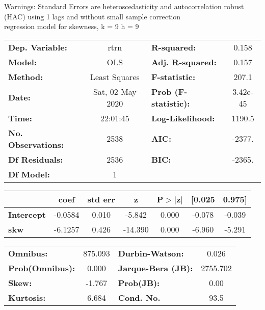 Warnings: \newline
 [1] Standard Errors are heteroscedasticity and autocorrelation robust (HAC) using 1 lags and without small sample correction\\ 

regression model for skewness, k = 9 h = 9\begin{center}
\begin{tabular}{lclc}
\toprule
\textbf{Dep. Variable:}    &       rtrn       & \textbf{  R-squared:         } &     0.158   \\
\textbf{Model:}            &       OLS        & \textbf{  Adj. R-squared:    } &     0.157   \\
\textbf{Method:}           &  Least Squares   & \textbf{  F-statistic:       } &     207.1   \\
\textbf{Date:}             & Sat, 02 May 2020 & \textbf{  Prob (F-statistic):} &  3.42e-45   \\
\textbf{Time:}             &     22:01:45     & \textbf{  Log-Likelihood:    } &    1190.5   \\
\textbf{No. Observations:} &        2538      & \textbf{  AIC:               } &    -2377.   \\
\textbf{Df Residuals:}     &        2536      & \textbf{  BIC:               } &    -2365.   \\
\textbf{Df Model:}         &           1      & \textbf{                     } &             \\
\bottomrule
\end{tabular}
\begin{tabular}{lcccccc}
                   & \textbf{coef} & \textbf{std err} & \textbf{z} & \textbf{P$> |$z$|$} & \textbf{[0.025} & \textbf{0.975]}  \\
\midrule
\textbf{Intercept} &      -0.0584  &        0.010     &    -5.842  &         0.000        &       -0.078    &       -0.039     \\
\textbf{skw}       &      -6.1257  &        0.426     &   -14.390  &         0.000        &       -6.960    &       -5.291     \\
\bottomrule
\end{tabular}
\begin{tabular}{lclc}
\textbf{Omnibus:}       & 875.093 & \textbf{  Durbin-Watson:     } &    0.026  \\
\textbf{Prob(Omnibus):} &   0.000 & \textbf{  Jarque-Bera (JB):  } & 2755.702  \\
\textbf{Skew:}          &  -1.767 & \textbf{  Prob(JB):          } &     0.00  \\
\textbf{Kurtosis:}      &   6.684 & \textbf{  Cond. No.          } &     93.5  \\
\bottomrule
\end{tabular}
\end{center}

